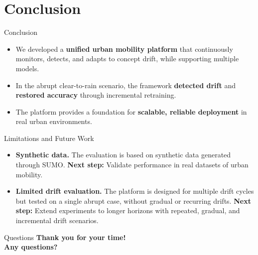\documentclass[aspectratio=169,11pt]{beamer}
\begin{document}
\section{Conclusion}

\begin{frame}{Conclusion}
    \begin{itemize}

        \item We developed a \textbf{unified urban mobility platform} that continuously monitors, detects, and adapts to concept drift, while supporting multiple models.
        \item In the abrupt clear-to-rain scenario, the framework \textbf{detected drift} and \textbf{restored accuracy} through incremental retraining.
        \item The platform provides a foundation for \textbf{scalable, reliable deployment} in real urban environments.

    \end{itemize}
\end{frame}

\begin{frame}{Limitations and Future Work}
    \begin{itemize}
        \item \textbf{Synthetic data.} The evaluation is based on synthetic data generated through SUMO.
            \textbf{Next step:} Validate performance in real datasets of urban mobility.
            \medskip
        \item \textbf{Limited drift evaluation.} The platform is designed for multiple drift cycles but tested on a single abrupt case, without gradual or recurring drifts.
            \textbf{Next step:} Extend experiments to longer horizons with repeated, gradual, and incremental drift scenarios.
    \end{itemize}
\end{frame}

\begin{frame}[plain]{Questions}
    \centering
    \vfill
    {\large \textbf{Thank you for your time!}}\\[1em]
    {\large \textbf{Any questions?}}
    \vfill
\end{frame}
\end{document}
